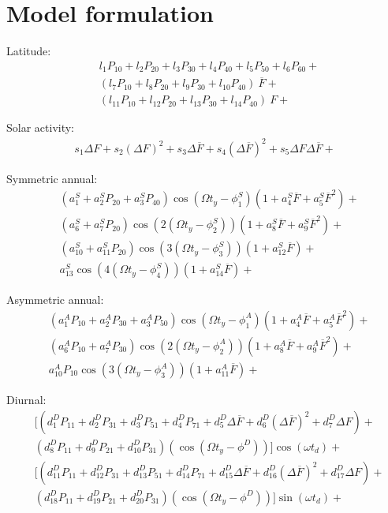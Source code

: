 \documentclass[referee,a4paper,12pt,traditabstract]{swsc}
\begin{document}
\begin{linenumbers}
\begin{acknowledgements}

\end{acknowledgements}

\appendix
\section{Model formulation}

Latitude:
\begin{align*}
& l_1 P_{10} + l_2 P_{20} + l_3 P_{30} + l_4 P_{40} + l_5 P_{50} + l_6 P_{60} + \\
& (l_7 P_{10} + l_8 P_{20} + l_9 P_{30} + l_{10} P_{40})~\overline{F} + \\
& (l_{11} P_{10} + l_{12} P_{20} + l_{13} P_{30} + l_{14} P_{40})~F +
\end{align*}

Solar activity:
\begin{align*}
s_1 \Delta F + s_2 (\Delta F)^2 + s_3 \Delta \overline{F} + s_4 (\Delta \overline{F})^2 + s_5 \Delta F \Delta \overline{F} +
\end{align*}

Symmetric annual:
\begin{align*}
&(a^S_1 + a^S_2 P_{20} + a^S_3P_{40})\cos(\Omega t_y-\phi^S_1)(1+a^S_4\overline{F}+ a^S_5\overline{F}^2) +\\
&(a^S_6 + a^S_7 P_{20})\cos(2(\Omega t_y-\phi^S_2))(1+a^S_8\overline{F}+ a^S_9\overline{F}^2) +\\
&(a^S_{10} + a^S_{11} P_{20})\cos(3(\Omega t_y-\phi^S_3))(1+a^S_{12}\overline{F})+\\
&a^S_{13}\cos(4(\Omega t_y-\phi^S_4))(1+a^S_{14}\overline{F})+
\end{align*}

Asymmetric annual:
\begin{align*}
&(a^A_1P_{10}+a^A_2P_{30}+a^A_3 P_{50})\cos(\Omega t_y-\phi^A_1)(1+a^A_4\overline{F}+a^A_5\overline{F}^2)+\\
&(a^A_6P_{10}+a^A_7P_{30})\cos(2(\Omega t_y-\phi^A_2))(1+a^A_8\overline{F}+a^A_9\overline{F}^2) + \\
&a^A_{10} P_{10}\cos(3(\Omega t_y-\phi^A_3))(1+a^A_{11}\overline{F})+
\end{align*}

Diurnal:
\begin{align*}
&[(d^D_1 P_{11}+d^D_2 P_{31}+d^D_3 P_{51}+d^D_4 P_{71} + d^D_5\Delta\overline{F} + d^D_6(\Delta\overline{F})^2 + d^D_7 \Delta F) + \\
&(d^D_8 P_{11} + d^D_9 P_{21} + d^D_{10} P_{31})(\cos(\Omega t_y-\phi^D))]\cos(\omega t_d)+\\
&[(d^D_{11} P_{11}+d^D_{12} P_{31}+d^D_{13} P_{51}+d^D_{14} P_{71} + d^D_{15}\Delta\overline{F} + d^D_{16}(\Delta\overline{F})^2 + d^D_{17} \Delta F) + \\
&(d^D_{18} P_{11} + d^D_{19} P_{21} + d^D_{20} P_{31})(\cos(\Omega t_y-\phi^D))]\sin(\omega t_d)+
\end{align*}


\end{linenumbers}
\end{document}
